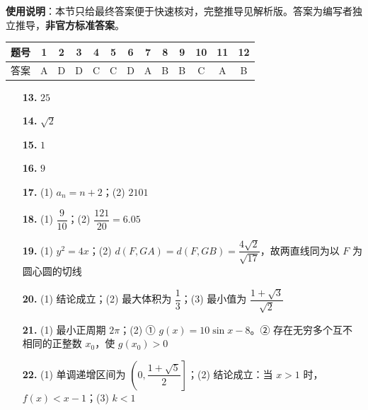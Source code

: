 
\begin{gknotice}
\textbf{使用说明}：本节只给最终答案便于快速核对，完整推导见解析版。答案为编写者独立推导，\textbf{非官方标准答案}。
\end{gknotice}

\begin{center}\begin{tabular}{ccccccccccccc}
\toprule
题号 & 1 & 2 & 3 & 4 & 5 & 6 & 7 & 8 & 9 & 10 & 11 & 12 \\
\midrule
答案 & A & D & D & C & C & D & A & B & B & C & A & B \\
\bottomrule
\end{tabular}\end{center}

\begin{itemize}[leftmargin=2.6em]
  \item[\textbf{13.}] \(25\)
  \item[\textbf{14.}] \(\sqrt2\)
  \item[\textbf{15.}] \(1\)
  \item[\textbf{16.}] \(9\)
\end{itemize}

\begin{itemize}[leftmargin=2.6em]
  \item[\textbf{17.}] (1) \(a_n=n+2\)；(2) \(2101\)
  \item[\textbf{18.}] (1) \(\dfrac9{10}\)；(2) \(\dfrac{121}{20}=6.05\)
  \item[\textbf{19.}] (1) \(y^2=4x\)；(2) \(d(F,GA)=d(F,GB)=\dfrac{4\sqrt2}{\sqrt{17}}\)，故两直线同为以 \(F\) 为圆心圆的切线
  \item[\textbf{20.}] (1) 结论成立；(2) 最大体积为 \(\dfrac13\)；(3) 最小值为 \(\dfrac{1+\sqrt3}{\sqrt2}\)
  \item[\textbf{21.}] (1) 最小正周期 \(2\pi\)；(2) ① \(g(x)=10\sin x-8\)。② 存在无穷多个互不相同的正整数 \(x_0\)，使 \(g(x_0)>0\)
  \item[\textbf{22.}] (1) 单调递增区间为 \(\left(0,\dfrac{1+\sqrt5}{2}\right]\)；(2) 结论成立：当 \(x>1\) 时，\(f(x)<x-1\)；(3) \(k<1\)
\end{itemize}
